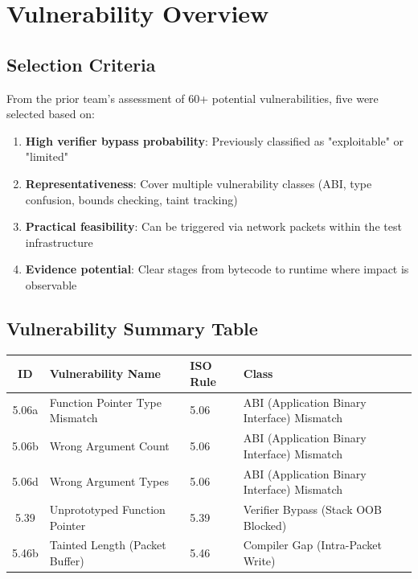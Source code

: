 \chapter{Vulnerability Overview}

\section{Selection Criteria}

From the prior team's assessment of 60+ potential vulnerabilities, five were selected based on:
\begin{enumerate}[label=\arabic*.]
  \item \textbf{High verifier bypass probability}: Previously classified as "exploitable" or "limited"
  \item \textbf{Representativeness}: Cover multiple vulnerability classes (ABI, type confusion, bounds checking, taint tracking)
  \item \textbf{Practical feasibility}: Can be triggered via network packets within the test infrastructure
  \item \textbf{Evidence potential}: Clear stages from bytecode to runtime where impact is observable
\end{enumerate}

\section{Vulnerability Summary Table}

\noindent
\begin{center}
\begin{tabular}{|c|l|l|l|}
\hline
\textbf{ID} & \textbf{Vulnerability Name} & \textbf{ISO Rule} & \textbf{Class} \\
\hline
5.06a & Function Pointer Type Mismatch & 5.06 & ABI (Application Binary Interface) Mismatch \\
5.06b & Wrong Argument Count & 5.06 & ABI (Application Binary Interface) Mismatch \\
5.06d & Wrong Argument Types & 5.06 & ABI (Application Binary Interface) Mismatch \\
5.39 & Unprototyped Function Pointer & 5.39 & Verifier Bypass (Stack OOB Blocked) \\
5.46b & Tainted Length (Packet Buffer) & 5.46 & Compiler Gap (Intra-Packet Write) \\
\hline
\end{tabular}
\end{center}


